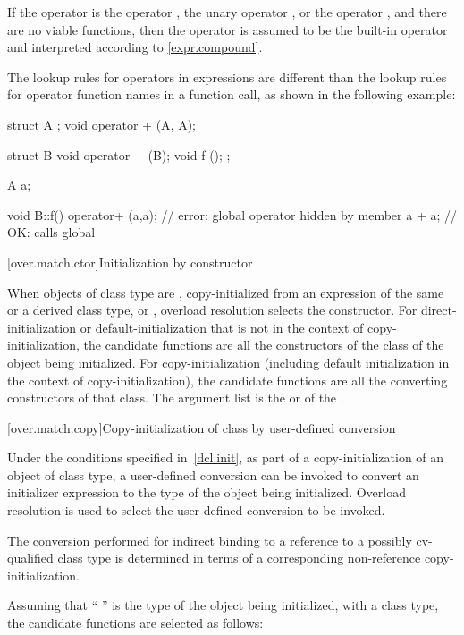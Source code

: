 \pnum
If the operator is the operator
\tcode{,},
the unary operator
\tcode{\&},
or the operator
\tcode{->},
and there are no viable functions, then the operator is
assumed to be the built-in operator and interpreted according to
\ref{expr.compound}.

\pnum
\begin{note}
The lookup rules for operators in expressions are different than
the lookup
rules for operator function names in a function call, as shown in the following
example:

\begin{codeblock}
struct A { };
void operator + (A, A);

struct B {
  void operator + (B);
  void f ();
};

A a;

void B::f() {
  operator+ (a,a);              // error: global operator hidden by member
  a + a;                        // OK: calls global 
}
\end{codeblock}
\end{note}

[over.match.ctor]{Initialization by constructor}%

\pnum
When objects of class type are ,
copy-initialized from an expression of the same or a
derived class type,
or ,
overload resolution selects the constructor.
For direct-initialization or default-initialization
that is not in the context of copy-initialization, the
candidate functions are
all the constructors of the class of the object being
initialized.
For copy-initialization (including default initialization
in the context of copy-initialization), the candidate functions are all
the converting constructors of that
class.
The argument list is the
 or 
of the .

[over.match.copy]{Copy-initialization of class by user-defined conversion}%

\pnum
Under the conditions specified in~\ref{dcl.init}, as
part of a copy-initialization of an object of class type, a user-defined
conversion can be invoked to convert an initializer expression to the
type of the object being initialized.
Overload resolution is used
to select the user-defined conversion to be invoked.
\begin{note}
The conversion performed for indirect binding to a reference to a possibly
cv-qualified class type is determined in terms of a corresponding non-reference
copy-initialization.
\end{note}
Assuming that
`` '' is the type of the object being initialized, with
a class type,
the candidate functions are selected as follows:

